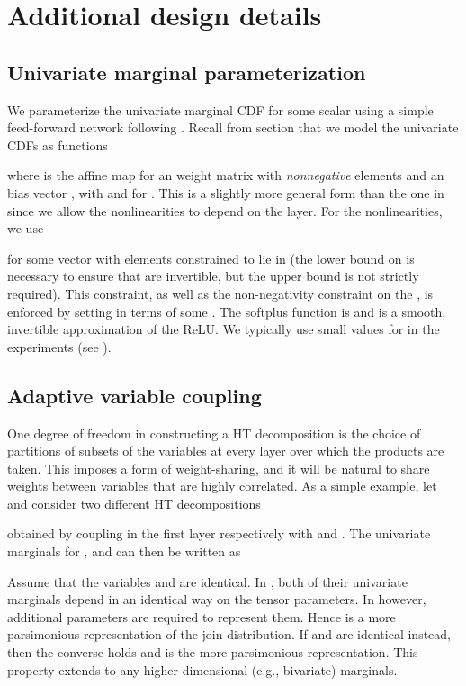\documentclass{article}
\begin{document}
\section{Additional design details} \label{app:design_details}


\subsection{Univariate marginal parameterization} 
\label{app:univariate_marginal_param}

We parameterize the univariate marginal CDF  for some scalar  using a simple feed-forward network following \cite{balle2018variational}. Recall from section  that we model the univariate CDFs as functions

where  is the affine map  for an  weight matrix  with \emph{nonnegative} elements and an  bias vector , with  and  for . This is a slightly more general form than the one in  since we allow the nonlinearities to depend on the layer. For the nonlinearities, we use 

for some vector  with elements constrained to lie in  (the lower bound on  is necessary to ensure that  are invertible, but the upper bound is not strictly required). This constraint, as well as the non-negativity constraint on the , is enforced by setting  in terms of some . The softplus function is  and is a smooth, invertible approximation of the ReLU. We typically use small values for  in the experiments (see ).  


 \subsection{Adaptive variable coupling}

One degree of freedom in constructing a HT decomposition is the choice of partitions of subsets of the variables at every layer over which the products are taken.
This imposes a form of weight-sharing, and it will be natural to share weights between variables that are highly correlated.
As a simple example, let  and consider two different HT decompositions

obtained by coupling  in the first layer respectively with  and .
The univariate marginals for ,  and  can then be written as

Assume that the variables  and  are identical. 
In , both of their univariate marginals depend in an identical way on the tensor parameters.
In  however, additional parameters are required to represent them.
Hence  is a more parsimonious representation of the join distribution.
If  and  are identical instead, then the converse holds and  is the more parsimonious representation.
This property extends to any higher-dimensional (e.g., bivariate) marginals.
\end{document}
